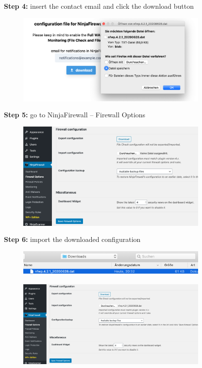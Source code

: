 \documentclass[a4paper]{article}
\begin{document}
\newpage

\noindent
\textbf{Step 4:} insert the contact email and click the download button

\begin{figure}[H]
  \centering
  \includegraphics[width=0.85\textwidth]{images/4.png}
\end{figure}

\noindent
\textbf{Step 5:} go to NinjaFirewall -- Firewall Options

\begin{figure}[H]
  \centering
  \includegraphics[width=0.85\textwidth]{images/5.png}
\end{figure}

\noindent
\textbf{Step 6:} import the downloaded configuration

\begin{figure}[H]
  \centering
  \includegraphics[width=0.85\textwidth]{images/6.png}
\end{figure}

\begin{figure}[H]
  \centering
  \includegraphics[width=0.85\textwidth]{images/7.png}
\end{figure}
\end{document}

